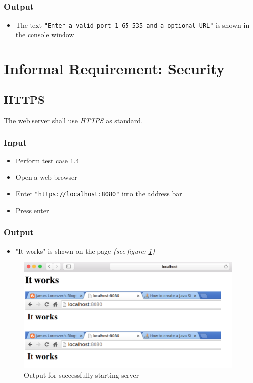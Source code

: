 \documentclass[a4paper, 12pt]{article}
\begin{document}
\subsubsection{Output} 
\begin{itemize}
\item The text \texttt{"Enter a valid port 1-65 535 and a optional URL"} is shown in the console window
\end{itemize}

\section{Informal Requirement: Security}

\subsection{HTTPS}

The web server shall use \textit{HTTPS} as standard.

\subsubsection{Input}
\begin{itemize}
\item Perform test case 1.4
\item Open a web browser
\item Enter \texttt{"https://localhost:8080"} into the address bar
\item Press enter
\end{itemize}

\subsubsection{Output}
\begin{itemize}
\item "It works" is shown on the page \textit{(see figure: \ref{TC6.1})}
\end{itemize}

\begin{figure}[H]
\includegraphics[scale=0.5]{output_clarification/TC1-1.png} 
\caption{Output for successfully starting server}
\label{TC6.1}
\end{figure}
\end{document}
